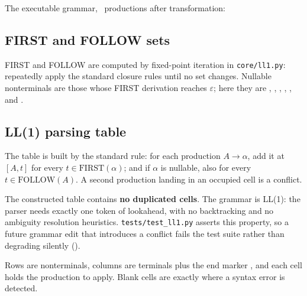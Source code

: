 The executable grammar, \ExecProductionCount\ productions after transformation:



\subsection{FIRST and FOLLOW sets}

FIRST and FOLLOW are computed by fixed-point iteration in \texttt{core/ll1.py}: repeatedly
apply the standard closure rules until no set changes. Nullable nonterminals are those
whose FIRST derivation reaches $\varepsilon$; here they are ,
, , , ,
 and .



\subsection{LL(1) parsing table}

The table is built by the standard rule: for each production $A \rightarrow \alpha$, add it
at $[A, t]$ for every $t \in \mathrm{FIRST}(\alpha)$; and if $\alpha$ is nullable, also for
every $t \in \mathrm{FOLLOW}(A)$. A second production landing in an occupied cell is a
conflict.

\begin{keypoint}
The constructed table contains \textbf{no duplicated cells}. The grammar is LL(1): the
parser needs exactly one token of lookahead, with no backtracking and no ambiguity
resolution heuristics. \texttt{tests/test\_ll1.py} asserts this property, so a future
grammar edit that introduces a conflict fails the test suite rather than degrading
silently ().
\end{keypoint}

Rows are nonterminals, columns are terminals plus the end marker \term{\$}, and each cell
holds the production to apply. Blank cells are exactly where a syntax error is detected.

\begin{landscape}

\end{landscape}
